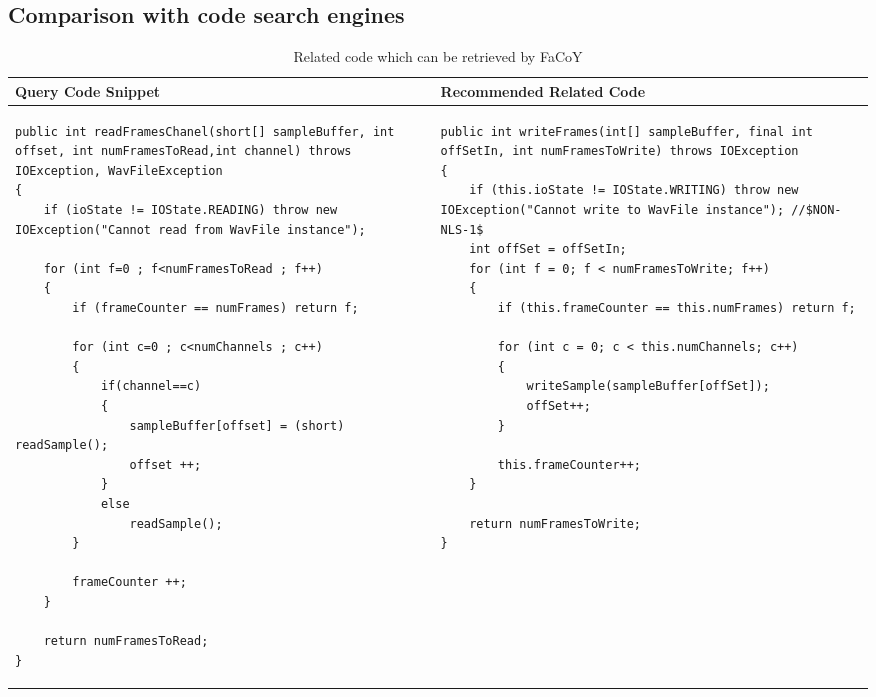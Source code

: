\subsection{Comparison with code search engines}


\lstset{
	frame=none,
	aboveskip=0pt,
	belowskip=0pt,
	basicstyle=\tiny\ttfamily,
}
\begin{table*}\scriptsize
	\caption{Related code which can be retrieved by FaCoY}
	\label{tab:facoy-example}
	
	\setlength{\tabcolsep}{0.01\textwidth}
	\begin{tabular}{@{}p{}p{}@{}}
		\toprule
		Query Code Snippet & Recommended Related Code \\
		\midrule


\begin{lstlisting}
public int readFramesChanel(short[] sampleBuffer, int offset, int numFramesToRead,int channel) throws IOException, WavFileException
{
	if (ioState != IOState.READING) throw new IOException("Cannot read from WavFile instance");

	for (int f=0 ; f<numFramesToRead ; f++)
	{
		if (frameCounter == numFrames) return f;

		for (int c=0 ; c<numChannels ; c++)
		{
			if(channel==c)
			{
				sampleBuffer[offset] = (short) readSample();
				offset ++;
			}
			else
				readSample();
		}

		frameCounter ++;
	}

	return numFramesToRead;
}
\end{lstlisting}
		
		&
\begin{lstlisting}
public int writeFrames(int[] sampleBuffer, final int offSetIn, int numFramesToWrite) throws IOException
{
	if (this.ioState != IOState.WRITING) throw new IOException("Cannot write to WavFile instance"); //$NON-NLS-1$
	int offSet = offSetIn;
	for (int f = 0; f < numFramesToWrite; f++)
	{
		if (this.frameCounter == this.numFrames) return f;

		for (int c = 0; c < this.numChannels; c++)
		{
			writeSample(sampleBuffer[offSet]);
			offSet++;
		}

		this.frameCounter++;
	}

	return numFramesToWrite;
}
		
\end{lstlisting}
\\

\bottomrule
	\end{tabular}
\end{table*}
		

